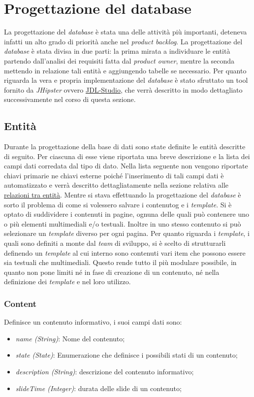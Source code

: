 \section{Progettazione del database}
La progettazione del \textit{database} è stata una delle attività più importanti, deteneva infatti un alto grado di priorità anche nel \textit{product backlog}. La progettazione del \textit{database} è stata divisa in due parti: la prima mirata a individuare le entità partendo dall'analisi dei requisiti fatta dal \textit{product owner}, mentre la seconda mettendo in relazione tali entità e aggiungendo tabelle se necessario. Per quanto riguarda la vera e propria implementazione del \textit{database} è stato sfruttato un tool fornito da \textit{JHipster} ovvero \href{https://start.JHipster.tech/jdl-studio/}{JDL-Studio}, che verrà descritto in modo dettagliato successivamente nel corso di questa sezione.

\subsection{Entità}
Durante la progettazione della base di dati sono state definite le entità descritte di seguito.
Per ciascuna di esse viene riportata una breve descrizione e la lista dei campi dati corredata dal tipo di dato. Nella lista seguente non vengono riportate chiavi primarie ne chiavi esterne poiché l'inserimento di tali campi dati è automatizzato e verrà descritto dettagliatamente nella sezione relativa alle \hyperref[rel]{relazioni tra entità}.
Mentre si stava effettuando la progettazione del \textit{database} è sorto il problema di come si volessero salvare i \gls{contenutog} e i \textit{template}. Si è optato di suddividere i contenuti in pagine, ognuna delle quali può contenere uno o più elementi multimediali e/o testuali. Inoltre in uno stesso contenuto si può selezionare un \textit{template} diverso per ogni pagina. Per quanto riguarda i \textit{template}, i quali sono definiti a monte dal \textit{team} di sviluppo, si è scelto di strutturarli definendo un \textit{template} al cui interno sono contenuti vari item che possono essere sia testuali che multimediali. Questo rende tutto il più modulare possibile, in quanto non pone limiti né in fase di creazione di un contenuto, né nella definizione dei \textit{template} e nel loro utilizzo. 
\subsubsection{Content}
Definisce un contenuto informativo, i suoi campi dati sono:
\begin{itemize}
    \item \textit{name (String)}: Nome del contenuto;
    \item \textit{state (State)}: Enumerazione che definisce i possibili stati di un contenuto;
    \item \textit{description (String)}: descrizione del contenuto informativo;
    \item \textit{slideTime (Integer)}: durata delle slide di un contenuto;
\end{itemize}

